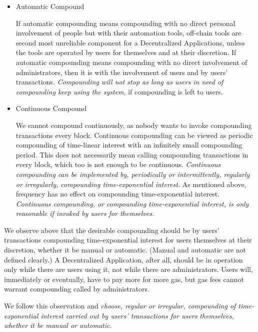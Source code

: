 \documentclass{article}
\begin{document}
\begin{itemize}
  \item Automatic Compound

  If automatic compounding means compounding with no direct personal involvement of 
  people but with their automation tools, off-chain tools are second most unreliable 
  component for a Decentralized Applications, unless the tools are operated by users 
  for themselves and at their discretion. 
  If automatic compounding means compounding with no direct involvement of 
  administrators, then it is with the involvement of users and by users' transactions.
  \textit{Compounding will not stop as long as users in need of compounding keep using 
  the system}, if compounding is left to users.
  
  \item Continuous Compound

  We cannot compound continuously, as nobody wants to invoke compounding transactions 
  every block.
  Continuous compounding can be viewed as 
  periodic compounding of time-linear interest with an infinitely small compounding period. 
  This does not necessarily mean calling compounding transactions in every block, 
  which too is not enough to be continuous.
  \textit{Continuous compounding can be implemented by, periodically or intermittently, 
  regularly or irregularly, compounding time-exponential interest.} 
  As mentioned above, frequency has no effect on compounding time-exponential interest. 
  \textit{Continuous compounding, or compounding time-exponential 
  interest, is only reasonable if invoked by users for themselves.}

\end{itemize}

We observe above that the desirable compounding should be by users' transactions 
compounding time-exponential interest for users themselves at their discretion, 
whether it be manual or automatic. (Manual and automatic are not defined clearly.)
A Decentralized Application, after all, should be in operation only while there are 
users using it, not while there are administrators.
Users will, immediately or eventually, have to pay more for more gas, 
but gas fees cannot warrant compounding called by administrators.

We follow this observation and 
\textit{choose, regular or irregular, compounding of time-exponential interest carried out  
by users' transactions for users themselves, whether it be manual or automatic.}
\end{document}
